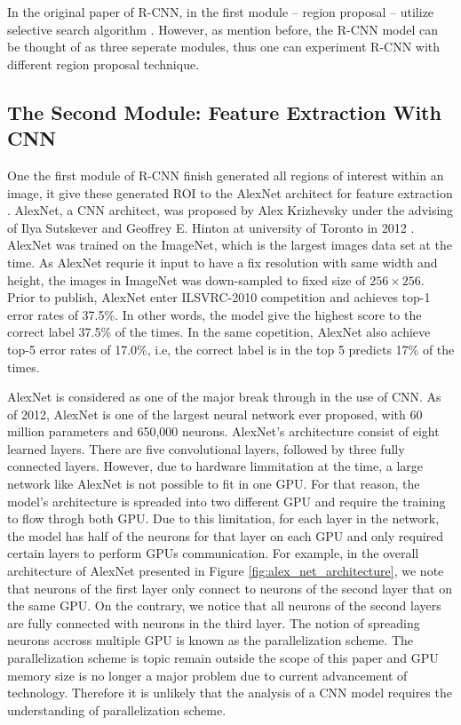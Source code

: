In the original paper of R-CNN, in the first module -- region proposal -- utilize selective search algorithm \cite{Girshick_R_CNN_2013}. However, as mention before, the R-CNN model can be thought of as three seperate modules, thus one can experiment R-CNN with different region proposal technique.

\subsection{The Second Module: Feature Extraction With CNN}
One the first module of R-CNN finish generated all regions of interest within an image, it give these generated ROI to the AlexNet architect for feature extraction \cite{Girshick_R_CNN_2013}. AlexNet, a CNN architect, was proposed by Alex Krizhevsky under the advising of Ilya Sutskever and Geoffrey E. Hinton at university of Toronto in 2012 \cite{AlexNet_2017}. AlexNet was trained on the ImageNet, which is the largest images data set at the time. As AlexNet requrie it input to have a fix resolution with same width and height, the images in ImageNet was down-sampled to fixed size of $256 \times 256$. Prior to publish, AlexNet enter ILSVRC-2010 competition and achieves top-1 error rates of 37.5\%. In other words, the model give the highest score to the correct label 37.5\% of the times. In the same copetition, AlexNet also achieve top-5 error rates of 17.0\%, i.e, the correct label is in the top 5 predicts 17\% of the times. 

AlexNet is considered as one of the major break through in the use of CNN. As of 2012, AlexNet is one of the largest neural network ever proposed, with 60 million parameters and 650,000 neurons. AlexNet's architecture consist of eight learned layers. There are five convolutional layers, followed by three fully connected layers. However, due to hardware limmitation at the time, a large network like AlexNet is not possible to fit in one GPU. For that reason, the model's architecture is spreaded into two different GPU and require the training to flow throgh both GPU. Due to this limitation, for each layer in the network, the model has half of the neurons for that layer on each GPU and only required certain layers to perform GPUs communication. For example, in the overall architecture of AlexNet presented in Figure \ref{fig:alex_net_architecture}, we note that neurons of the first layer only connect to neurons of the second layer that on the same GPU. On the contrary, we notice that all neurons of the second layers are fully connected with neurons in the third layer. The notion of spreading neurons accross multiple GPU is known as the parallelization scheme. The parallelization scheme is topic remain outside the scope of this paper and GPU memory size is no longer a major problem due to current advancement of technology. Therefore it is unlikely that the analysis of a CNN model requires the understanding of parallelization scheme.

